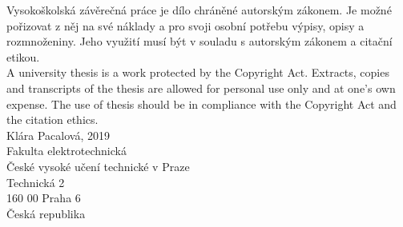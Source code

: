 \vfill

Vysokoškolská závěrečná práce je dílo chráněné autorským zákonem. Je možné pořizovat z něj na své náklady a pro svoji osobní potřebu výpisy, opisy a rozmnoženiny. Jeho využití musí být v souladu s autorským zákonem a citační etikou.\\

\noindent A university thesis is a work protected by the Copyright Act. Extracts, copies and transcripts of the thesis are allowed for personal use only and at one's own expense. The use of thesis should be in compliance with the Copyright Act and the citation ethics.\\

\noindent \textsuperscript{\textcopyright} Klára Pacalová, 2019\\
Fakulta elektrotechnická\\
České vysoké učení technické v Praze\\
Technická 2\\
160 00 Praha 6\\
Česká republika